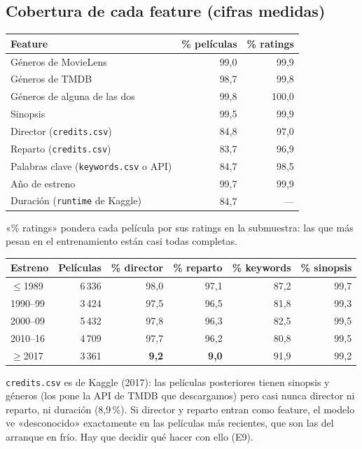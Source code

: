 \documentclass[a4paper,11pt]{article}
\begin{document}
\subsection{Cobertura de cada feature (cifras medidas)}
\begin{center}
\small
\begin{tabular}{lrr}
\toprule
Feature & \% películas & \% ratings \\
\midrule
Géneros de MovieLens & 99,0 & 99,9 \\
Géneros de TMDB & 98,7 & 99,8 \\
Géneros de alguna de las dos & 99,8 & 100,0 \\
Sinopsis & 99,5 & 99,9 \\
Director (\texttt{credits.csv}) & 84,8 & 97,0 \\
Reparto (\texttt{credits.csv}) & 83,7 & 96,9 \\
Palabras clave (\texttt{keywords.csv} o API) & 84,7 & 98,5 \\
Año de estreno & 99,7 & 99,9 \\
Duración (\texttt{runtime} de Kaggle) & 84,7 & --- \\
\bottomrule
\end{tabular}
\end{center}
«\% ratings» pondera cada película por sus ratings en la submuestra: las que más pesan en el entrenamiento están casi todas completas.

\begin{ojo}
\begin{center}
\small
\begin{tabular}{lrrrrr}
\toprule
Estreno & Películas & \% director & \% reparto & \% keywords & \% sinopsis \\
\midrule
$\le$1989 & 6\,336 & 98,0 & 97,1 & 87,2 & 99,7 \\
1990--99 & 3\,424 & 97,5 & 96,5 & 81,8 & 99,3 \\
2000--09 & 5\,432 & 97,8 & 96,3 & 82,5 & 99,5 \\
2010--16 & 4\,709 & 97,7 & 96,2 & 80,8 & 99,5 \\
$\ge$2017 & 3\,361 & \textbf{9,2} & \textbf{9,0} & 91,9 & 99,2 \\
\bottomrule
\end{tabular}
\end{center}
\texttt{credits.csv} es de Kaggle (2017): las películas posteriores tienen sinopsis y géneros (los pone la API de TMDB que
descargamos) pero casi nunca director ni reparto, ni duración (8,9\,\%). Si director y reparto entran como feature, el modelo ve
«desconocido» exactamente en las películas más recientes, que son las del arranque en frío. Hay que decidir qué hacer con
ello (E9).
\end{ojo}
\end{document}
